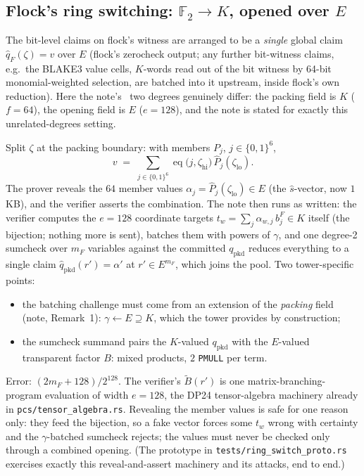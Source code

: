 \documentclass[11pt]{article}
\newcommand{\F}{\mathbb{F}}
\newcommand{\K}{K}            %
\newcommand{\E}{E}            %
\newcommand{\eq}{\operatorname{eq}}
\newcommand{\cube}[1]{\{0,1\}^{#1}}
\newcommand{\pkd}{\mathrm{pkd}}
\begin{document}
\subsection{Flock's ring switching: $\F_2\to\K$, opened over $\E$}\label{sec:multi}

The bit-level claims on flock's witness are arranged to be a
\emph{single} global claim $\widehat q_F(\zeta)=v$ over $\E$ (flock's
zerocheck output; any further bit-witness claims, e.g.\ the BLAKE3 value
cells, $\K$-words read out of the bit witness by 64-bit monomial-weighted
selection, are batched into it upstream, inside flock's own reduction).
Here the note's~\cite{rsgen} two degrees genuinely differ: the packing
field is $\K$ ($f=64$), the opening field is $\E$ ($e=128$), and the note
is stated for exactly this unrelated-degrees setting.

Split $\zeta$ at the packing boundary: with members $P_j$, $j\in\cube{6}$,
\[
  v\;=\;\sum_{j\in\cube{6}}
  \eq\bigl(j,\zeta_{\mathrm{hi}}\bigr)\,
  \widehat P_{j}(\zeta_{\mathrm{lo}}) .
\]
The prover reveals the $64$ member values
$\alpha_{j}=\widehat P_{j}(\zeta_{\mathrm{lo}})\in\E$ (the
$\widehat s$-vector, now $1$\,KB), and the verifier asserts the
combination. The note then runs as written: the verifier computes the
$e=128$ coordinate targets $t_w=\sum_j\alpha_{w,j}\,b^F_j\in\K$ itself
(the bijection; nothing more is sent), batches them with powers of
$\gamma$, and one degree-2 sumcheck over $m_F$ variables against the
committed $q_\pkd$ reduces everything to a single claim
$\widehat q_\pkd(r')=\alpha'$ at $r'\in\E^{m_F}$, which joins the pool.
Two tower-specific points:
\begin{itemize}
\item the batching challenge must come from an extension of the
  \emph{packing} field (note, Remark~1): $\gamma\leftarrow\E\supseteq\K$,
  which the tower provides by construction;
\item the sumcheck summand pairs the $\K$-valued $q_\pkd$ with the
  $\E$-valued transparent factor $B$: mixed products, $2$ \texttt{PMULL}
  per term.
\end{itemize}
Error: $(2m_F+128)/2^{128}$. The verifier's $\widetilde B(r')$ is one
matrix-branching-program evaluation of width $e=128$, the DP24
tensor-algebra machinery already in \texttt{pcs/tensor\_algebra.rs}.
Revealing the member values is safe for one reason only: they feed the
bijection, so a fake vector forces some $t_w$ wrong with certainty and the
$\gamma$-batched sumcheck rejects; the values must never be checked only
through a combined opening. (The prototype in
\texttt{tests/ring\_switch\_proto.rs} exercises exactly this
reveal-and-assert machinery and its attacks, end to end.)
\end{document}
